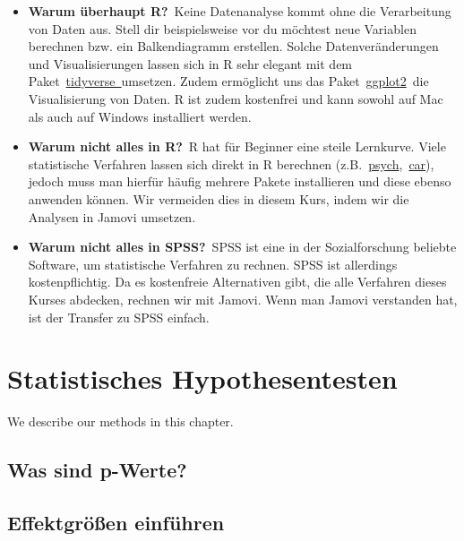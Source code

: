 \documentclass[
]{book}
\begin{document}
\begin{itemize}
\item
  \textbf{Warum überhaupt R?}~Keine Datenanalyse kommt ohne die Verarbeitung von Daten aus. Stell dir beispielsweise vor du möchtest neue Variablen berechnen bzw. ein Balkendiagramm erstellen. Solche Datenveränderungen und Visualisierungen lassen sich in R sehr elegant mit dem Paket~\href{https://www.tidyverse.org/}{tidyverse~}umsetzen. Zudem ermöglicht uns das Paket~\href{https://ggplot2.tidyverse.org/}{ggplot2}~die Visualisierung von Daten. R ist zudem kostenfrei und kann sowohl auf Mac als auch auf Windows installiert werden.
\item
  \textbf{Warum nicht alles in R?}~R hat für Beginner eine steile Lernkurve. Viele statistische Verfahren lassen sich direkt in R berechnen (z.B.~\href{https://cran.r-project.org/web/packages/psych/index.html}{psych},~\href{https://cran.r-project.org/web/packages/car/index.html}{car}), jedoch muss man hierfür häufig mehrere Pakete installieren und diese ebenso anwenden können. Wir vermeiden dies in diesem Kurs, indem wir die Analysen in Jamovi umsetzen.
\item
  \textbf{Warum nicht alles in SPSS?}~SPSS ist eine in der Sozialforschung beliebte Software, um statistische Verfahren zu rechnen. SPSS ist allerdings kostenpflichtig. Da es kostenfreie Alternativen gibt, die alle Verfahren dieses Kurses abdecken, rechnen wir mit Jamovi. Wenn man Jamovi verstanden hat, ist der Transfer zu SPSS einfach.
\end{itemize}

\hypertarget{statistisches-hypothesentesten}{%
\chapter{Statistisches Hypothesentesten}\label{statistisches-hypothesentesten}}

We describe our methods in this chapter.

\hypertarget{was-sind-p-werte}{%
\section{Was sind p-Werte?}\label{was-sind-p-werte}}

\hypertarget{effektgruxf6uxdfen-einfuxfchren}{%
\section{Effektgrößen einführen}\label{effektgruxf6uxdfen-einfuxfchren}}
\end{document}
